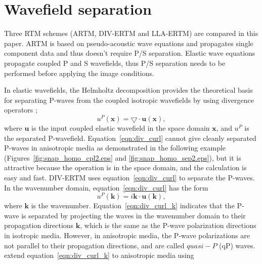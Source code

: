 \documentclass[manuscript,ulem,graphix,revised]{geophysics}
\begin{document}
\section{Wavefield separation} 
\indent\indent
Three RTM schemes (ARTM, DIV-ERTM and LLA-ERTM) are compared in this paper. ARTM is based on pseudo-acoustic wave equations and propagates single component data and thus doesn't require P/S separation. Elastic wave equations propagate coupled P and S wavefields, thus P/S separation needs to be performed before applying the image conditions. 

In elastic wavefields, the Helmholtz decomposition provides the theoretical basis for separating P-waves from the coupled isotropic wavefields by using divergence operators \citep{aki80};
\begin{equation}
u^{P}(\boldsymbol{x})=\bigtriangledown \cdot \boldsymbol{u}(\boldsymbol{x}),
\label{eqn:div_curl}
\end{equation}
where $\boldsymbol{u}$ is the input coupled elastic wavefield in the space domain $\boldsymbol{x}$, and $u^{P}$ is the separated P-wavefield. 
Equation~\ref{eqn:div_curl} cannot give cleanly separated P-waves in anisotropic media as demonstrated in the following example (Figures~\ref{fig:snap_homo_cpl2.eps} and \ref{fig:snap_homo_sep2.eps}), but it is attractive because the operation is in the space domain, and the calculation is easy and fast. DIV-ERTM uses equation~\ref{eqn:div_curl} to separate the P-waves. In the wavenumber domain, equation~\ref{eqn:div_curl} has the form
\begin{equation}
u^{P}(\boldsymbol{k})=i \boldsymbol{k} \cdot \boldsymbol{u}(\boldsymbol{k}),
\label{eqn:div_curl_k}
\end{equation}
where $\boldsymbol{k}$ is the wavenumber. Equation~\ref{eqn:div_curl_k} indicates that the P-wave is separated by projecting the waves in the wavenumber domain to their propagation directions $\boldsymbol{k}$, which is the same as the P-wave polarization directions in isotropic media. However, in anisotropic media, the P-wave polarizations are not parallel to their propagation directions, and are called $quasi-P$ (qP) waves. \citet{dellinger90} extend equation~\ref{eqn:div_curl_k} to anisotropic media using
\end{document}
